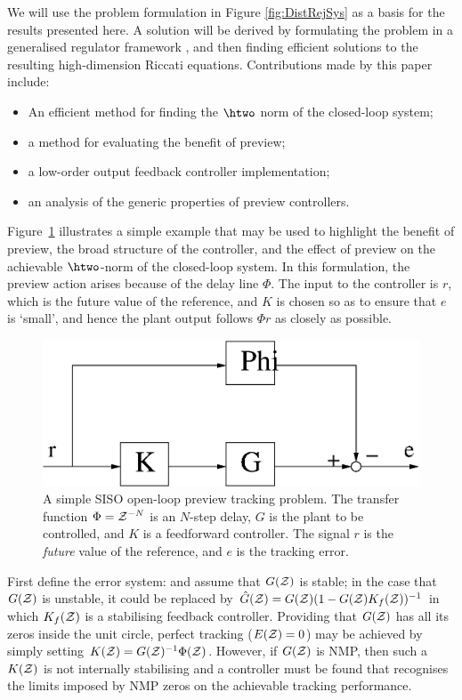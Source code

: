 We will use the problem formulation in Figure \ref{fig:DistRejSys} as a basis for the results presented here. A solution will be derived
by formulating the problem in a generalised regulator framework \cite{LimebeerGreen,ZDG}, and then finding efficient solutions to the resulting high-dimension Riccati equations. Contributions made by this paper include:
\begin{itemize}
\item An efficient method for finding the $\htwo$ norm of the closed-loop system;
\item a method for evaluating the benefit of preview;
\item a low-order output feedback controller implementation;
\item an analysis of the  generic properties of preview controllers.
\end{itemize}

Figure~\ref{fig:SimpleSISOPrev} illustrates a simple example that may be used to highlight the benefit of preview, the broad structure of the controller, and the effect of preview on the achievable $\htwo$-norm of the closed-loop system. In this formulation, the preview action arises because of the delay line $\Phi$. The input to the controller is $r$, which is the future value of the reference, and $K$ is chosen so as to ensure that $e$ is `small', and hence the plant output follows $\Phi r$ as closely as possible. 
\begin{figure}
\stdcontrolfrags
\begin{center}
\includegraphics[width=0.4\hsize]{./diags/SimpleExampleNominalNoK2.eps}
\end{center}
\caption{A simple SISO open-loop preview tracking problem. The transfer function $\Phi=\mathcal{Z}^{-N}$ is an $N$-step delay, $G$ is the plant to be controlled, and $K$ is a feedforward controller. The signal $r$ is the \textit{future} value of the reference, and $e$ is the tracking error.}
\label{fig:SimpleSISOPrev}
\end{figure}
%
First define the error system:
and assume that $G(\mathcal{Z})$ is stable; in the case that $G(\mathcal{Z})$ is unstable, it could be replaced by $\hat G(\mathcal{Z})=G(\mathcal{Z})(1-G(\mathcal{Z})K_f(\mathcal{Z}))^{-1}$ in which $K_f(\mathcal{Z})$ is a stabilising feedback controller. Providing that $G(\mathcal{Z})$ has all its zeros inside the unit circle, perfect tracking ($E(\mathcal{Z})=0$) may be achieved by simply setting $K(\mathcal{Z})=G(\mathcal{Z})^{-1}\Phi(\mathcal{Z})$. 
However, if $G(\mathcal{Z})$ is {NMP}, then such a $K(\mathcal{Z})$ is not internally stabilising and a controller must be found that recognises the limits imposed by {NMP} zeros on the achievable tracking performance. %

